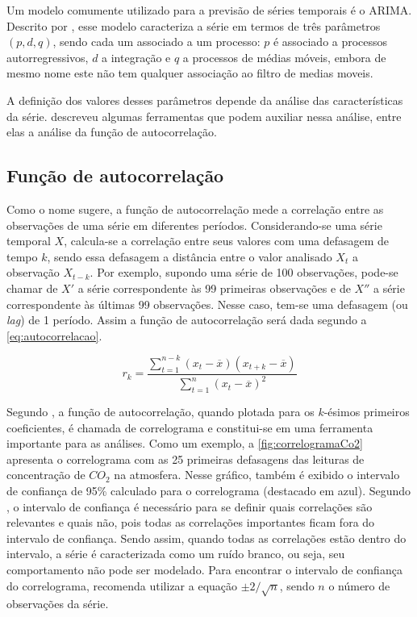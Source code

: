 \documentclass[
    12pt,
    oneside,
    a4paper,
    english,
    brazil
]{abntex2}
\begin{document}
Um modelo comumente utilizado para a  previsão de séries temporais é o ARIMA\@.
Descrito por  , esse  modelo caracteriza a  série em  termos de
três  parâmetros $(p,d,q)$,  sendo  cada  um associado  a  um  processo: $p$  é
associado a processos  autorregressivos, $d$ a integração e $q$  a processos de
médias móveis, embora de mesmo nome  este não tem qualquer associação ao filtro
de medias moveis.

A   definição  dos   valores   desses  parâmetros   depende   da  análise   das
características da  série.   descreveu algumas  ferramentas que
podem auxiliar nessa análise, entre elas a análise da função de autocorrelação.

\subsection{Função de autocorrelação}\label{sec:corre}

Como  o nome  sugere, a  função de  autocorrelação mede  a correlação  entre as
observações  de uma  série em  diferentes períodos.  Considerando-se uma  série
temporal $X$, calcula-se  a correlação entre seus valores com  uma defasagem de
tempo $k$,  sendo essa defasagem  a distância entre  o valor analisado  $X_t$ a
observação  $X_{t-k}$.  Por exemplo,  supondo  uma  série de  100  observações,
pode-se chamar de $X'$ a série  correspondente às 99 primeiras observações e de
$X''$ a série correspondente às últimas  99 observações. Nesse caso, tem-se uma
defasagem (ou \textit{lag}) de 1 período. Assim a função de autocorrelação será
dada segundo a \autoref{eq:autocorrelacao}.

\begin{equation}
    \label{eq:autocorrelacao}
    r_k = \frac{\sum_{t=1}^{n-k}{(x_t - \overline{x})(x_{t+k} -
    \overline{x})}}{\sum_{t=1}^{n}{(x_t - \overline{x})^2}}
\end{equation}

Segundo  ,  a  função   de  autocorrelação,  quando  plotada
para  os  $k$-ésimos  primeiros  coeficientes,  é  chamada  de  correlograma  e
constitui-se em uma ferramenta importante para  as análises. Como um exemplo, a
\autoref{fig:correlogramaCo2}  apresenta o  correlograma  com  as 25  primeiras
defasagens das leituras de concentração  de $CO_2$ na atmosfera. Nesse gráfico,
também é exibido o intervalo de confiança de 95\% calculado para o correlograma
(destacado  em  azul).  Segundo   , o intervalo de confiança é necessário para se definir quais correlações são relevantes e quais não, pois todas as correlações importantes ficam fora do intervalo de  confiança. Sendo assim, quando todas as  correlações estão dentro do intervalo, a série  é caracterizada como um  ruído branco, ou  seja, seu comportamento não pode ser modelado. Para encontrar o  intervalo de confiança do correlograma,   recomenda utilizar a equação $\pm{}2/\sqrt{n}$, sendo $n$ o número de observações da série.
\end{document}
